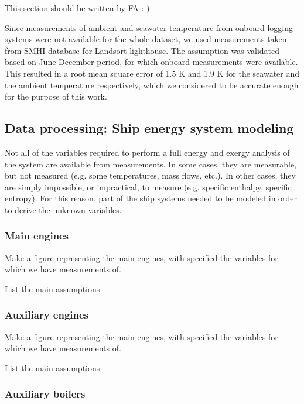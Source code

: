 \documentclass[preprint,12pt]{elsarticle}
\begin{document}
This section should be written by FA :-)

Since measurements of ambient and seawater temperature from onboard logging systems were not available for the whole dataset, we used measurements taken from SMHI database for Landsort lighthouse. The assumption was validated based on  June-December period, for which onboard measurements were available. This resulted in a root mean square error of 1.5 K and 1.9 K for the seawater and the ambient temperature respectively, which we considered to be accurate enough for the purpose of this work.

\subsection{Data processing: Ship energy system modeling} \label{sec:met:modeling}

Not all of the variables required to perform a full energy and exergy analysis of the system are available from measurements. In some cases, they are measurable, but not measured (e.g. some temperatures, mass flows, etc.). In other cases, they are simply impossible, or impractical, to measure (e.g. specific enthalpy, specific entropy). For this reason, part of the ship systems needed to be modeled in order to derive the unknown variables. 

\subsubsection*{Main engines}

Make a figure representing the main engines, with specified the variables for which we have measurements of. 

List the main assumptions

\subsubsection*{Auxiliary engines}

Make a figure representing the main engines, with specified the variables for which we have measurements of. 

List the main assumptions

\subsubsection*{Auxiliary boilers}
\end{document}
